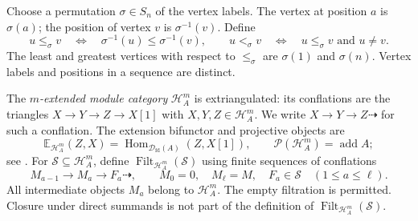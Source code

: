 \documentclass[11pt,a4paper]{article}
\newcommand{\defn}[1]{\textsl{\color{darkblue} #1}}
\newcommand{\D}{\mathcal D}
\renewcommand{\H}{\mathcal H}
\DeclareMathOperator{\fd}{fd}
\DeclareMathOperator{\Hom}{Hom}
\DeclareMathOperator{\add}{add}
\DeclareMathOperator{\Filt}{Filt}
\theoremstyle{plain}
\theoremstyle{definition}
\numberwithin{equation}{section}
\begin{document}
Choose a permutation $\sigma\in S_n$ of the vertex labels. The vertex
at position $a$ is $\sigma(a)$; the position of vertex $v$ is
$\sigma^{-1}(v)$. Define
\begin{equation}\label{eq:order}
 u\leq_\sigma v\quad\Longleftrightarrow\quad
 \sigma^{-1}(u)\leq\sigma^{-1}(v),\qquad
 u<_\sigma v\quad\Longleftrightarrow\quad
 u\leq_\sigma v\text{ and }u\neq v.
\end{equation}
The least and greatest vertices with respect to $\leq_\sigma$ are
$\sigma(1)$ and $\sigma(n)$.
Vertex labels and positions in a sequence are distinct.

The \defn{$m$-extended module category} $\H_A^m$ is extriangulated:
its conflations are the triangles
$X\to Y\to Z\to X[1]$ with $X,Y,Z\in\H_A^m$.
We write $X\to Y\to Z\dashrightarrow$ for such a conflation.
The extension bifunctor and projective objects are
\begin{equation}\label{eq:extriangulated}
 \mathbb E_{\H_A^m}(Z,X)=\Hom_{\D_{\fd}(A)}(Z,X[1]),
 \qquad\mathcal P(\H_A^m)=\add A;
\end{equation}
see \cite[\S1 and Corollary 2.3]{MP25}.
For $\mathcal S\subseteq\H_A^m$, define
$\Filt_{\H_A^m}(\mathcal S)$ using finite sequences of conflations
\begin{equation}\label{eq:filtration}
 M_{a-1}\longrightarrow M_a\longrightarrow F_a\dashrightarrow,
 \qquad M_0=0,\quad M_\ell=M,\quad F_a\in\mathcal S
 \quad(1\leq a\leq\ell).
\end{equation}
All intermediate objects $M_a$ belong to $\H_A^m$.
The empty filtration is permitted. Closure under direct summands is
not part of the definition of $\Filt_{\H_A^m}(\mathcal S)$.
\end{document}

